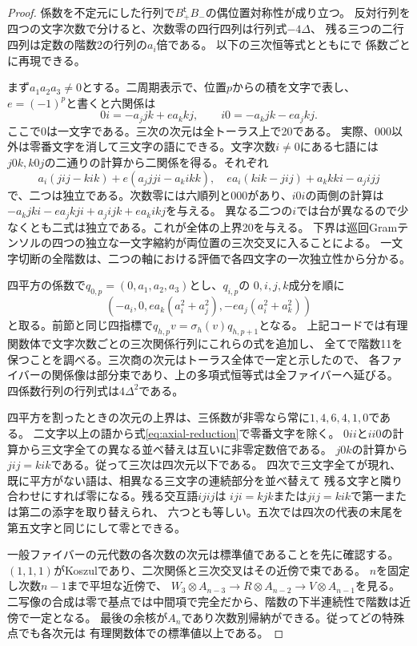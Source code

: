 \begin{proof}
係数を不定元にした行列で$B_+^{\mathsf t} B_-$の偶位置対称性が成り立つ。
反対行列を四つの文字次数で分けると、次数零の四行四列は行列式$-4\Delta$、
残る三つの二行四列は定数の階数2の行列の$a_i$倍である。
以下の三次恒等式とともにで
係数ごとに再現できる。

まず$a_1a_2a_3\ne0$とする。二周期表示で、位置$p$からの積を文字で表し、
$e=(-1)^p$と書くと六関係は
\begin{equation}\label{eq:axial-reduction}
 0i=-a_j jk+e a_k kj,\qquad i0=-a_k jk-e a_j kj .
\end{equation}
ここで$0$は一文字である。三次の次元は全トーラス上で20である。
実際、$000$以外は零番文字を消して三文字の語にできる。文字次数$i\ne0$にある七語には
$j0k,k0j$の二通りの計算から二関係を得る。それぞれ
\[
 a_i(jij-kik)+e(a_j jji-a_k ikk),\quad
 e a_i(kik-jij)+a_k kki-a_j ijj
\]
で、二つは独立である。次数零には六順列と$000$があり、$i0i$の両側の計算は
$-a_k jki-e a_j kji+a_j ijk+e a_k ikj$を与える。
異なる二つの$i$では台が異なるので少なくとも二式は独立である。これが全体の上界20を与える。
下界は巡回Gramテンソルの四つの独立な一文字縮約が両位置の三次交叉に入ることによる。
一文字切断の全階数は、二つの軸における評価で各四文字の一次独立性から分かる。

四平方の係数で$q_{0,p}=(0,a_1,a_2,a_3)$とし、$q_{i,p}$の
$0,i,j,k$成分を順に
\[
 (-a_i,0,e a_k(a_i^2+a_j^2),-e a_j(a_i^2+a_k^2))
\]
と取る。前節と同じ四指標で$q_{h,p}v=\sigma_h(v)q_{h,p+1}$となる。
上記コードでは有理関数体で文字次数ごとの三次関係行列にこれらの式を追加し、
全てで階数11を保つことを調べる。三次商の次元はトーラス全体で一定と示したので、
各ファイバーの関係像は部分束であり、上の多項式恒等式は全ファイバーへ延びる。
四係数行列の行列式は$4\Delta^2$である。

四平方を割ったときの次元の上界は、三係数が非零なら常に$1,4,6,4,1,0$である。
二文字以上の語から式\eqref{eq:axial-reduction}で零番文字を除く。
$0ii$と$ii0$の計算から三文字全ての異なる並べ替えは互いに非零定数倍である。
$j0k$の計算から$jij=kik$である。従って三次は四次元以下である。
四次で三文字全てが現れ、既に平方がない語は、相異なる三文字の連続部分を並べ替えて
残る文字と隣り合わせにすれば零になる。残る交互語$ijij$は
$i j i=k j k$または$j i j=k i k$で第一または第二の添字を取り替えられ、
六つとも等しい。五次では四次の代表の末尾を第五文字と同じにして零とできる。

一般ファイバーの元代数の各次数の次元は標準値であることを先に確認する。
$(1,1,1)$がKoszulであり、二次関係と三次交叉はその近傍で束である。
$n$を固定し次数$n-1$まで平坦な近傍で、
$W_3\otimes A_{n-3}\to R\otimes A_{n-2}\to V\otimes A_{n-1}$を見る。
二写像の合成は零で基点では中間項で完全だから、階数の下半連続性で階数は近傍で一定となる。
最後の余核が$A_n$であり次数別帰納ができる。従ってどの特殊点でも各次元は
有理関数体での標準値以上である。


\end{proof}
